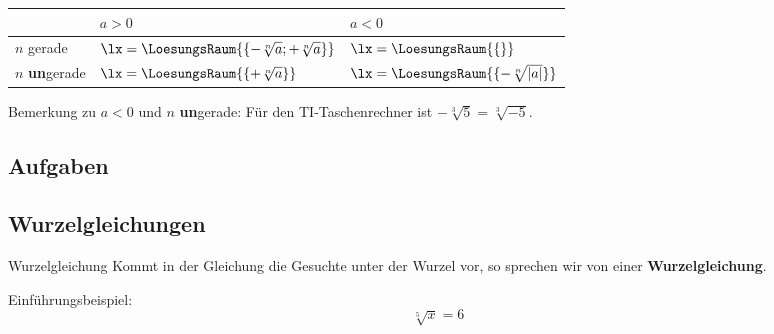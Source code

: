 \begin{gesetz}{}{}

 \begin{center}\end{center}
 \begin{center}\end{center}

 \renewcommand{\arraystretch}{2}

 \begin{tabular}{l|l|l}
                        & $a>0$                                  & $a<0$                      \\\hline
  $n$ gerade            & $\lx =\LoesungsRaum{\{-\sqrt[n]{a}; +\sqrt[n]{a}\}}$ & $\lx=\LoesungsRaum{\{\}}$               \\\hline
  $n$ \textbf{un}gerade & $\lx = \LoesungsRaum{\{+\sqrt[n]{a}\}}$               & $\lx = \LoesungsRaum{\{-\sqrt[n]{|a|}\}}$
 \end{tabular}  

 \renewcommand{\arraystretch}{1}

\end{gesetz}
Bemerkung zu $a<0$ und $n$ \textbf{un}gerade: Für den TI-Taschenrechner ist $-\sqrt[3]{5} = \sqrt[3]{-5}$.



\subsection*{Aufgaben}



\newpage

\subsection{Wurzelgleichungen}


\begin{definition}{Wurzelgleichung}{}
Kommt in der Gleichung die Gesuchte unter der Wurzel vor, so sprechen
wir von einer \textbf{Wurzelgleichung}.
\end{definition}
Einführungsbeispiel:
$$\sqrt[5]{x}=6$$


